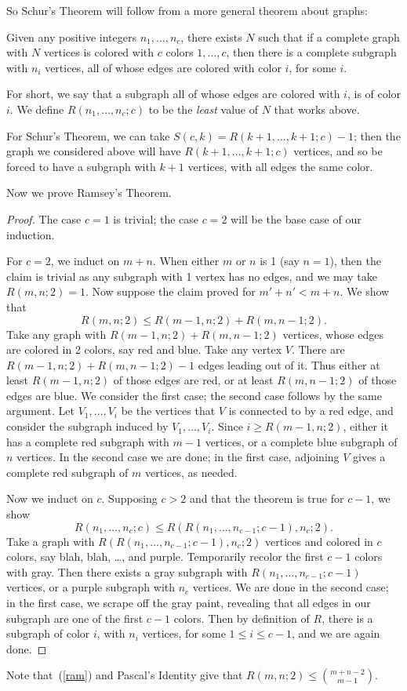 So Schur's Theorem will follow from a more general theorem about graphs:
\begin{thm}[Ramsey]\label{ramsey}
Given any positive integers $n_1,\ldots, n_c$, there exists $N$ such that if a complete graph with $N$ vertices is colored with $c$ colors $1,\ldots, c$, then there is a complete subgraph with $n_i$ vertices, all of whose edges are colored with color $i$, for some $i$.
\end{thm}
For short, we say that a subgraph all of whose edges are colored with $i$, is of color $i$. 
We define $R(n_1,\ldots, n_c;c)$ to be the {\it least} value of $N$ that works above.

For Schur's Theorem, we can take $S(c,k)=R(k+1,\ldots, k+1;c)-1$; then the graph we considered above will have $R(k+1,\ldots, k+1;c)$ vertices, and so be forced to have a subgraph with $k+1$ vertices, with all edges the same color.

Now we prove Ramsey's Theorem.
\begin{proof}
The case $c=1$ is trivial; the case $c=2$ will be the base case of our induction. 

For $c=2$, we induct on $m+n$.
When either $m$ or $n$ is 1 (say $n=1$), then the claim is trivial as any subgraph with 1 vertex has no edges, and we may take $R(m,n;2)=1$. Now suppose the claim proved for $m'+n'<m+n$. We show that
\begin{equation}\label{ram}
R(m,n;2)\leq R(m-1,n;2)+R(m,n-1;2).
\end{equation}
Take any graph with $R(m-1,n;2)+R(m,n-1;2)$ vertices, whose edges are colored in 2 colors, say red and blue. Take any vertex $V$. There are $R(m-1,n;2)+R(m,n-1;2)-1$ edges leading out of it. Thus either at least $R(m-1,n;2)$ of those edges are red, or at least $R(m,n-1;2)$ of those edges are blue. We consider the first case; the second case follows by the same argument. Let $V_1,\ldots, V_i$ be the vertices that $V$ is connected to by a red edge, and consider the subgraph induced by $V_1,\ldots, V_i$.  Since $i\geq R(m-1,n;2)$, either it has a complete red subgraph with $m-1$ vertices, or a complete blue subgraph of $n$ vertices. In the second case we are done; in the first case, adjoining $V$ gives a complete red subgraph of $m$ vertices, as needed.

Now we induct on $c$. Supposing $c>2$ and that the theorem is true for $c-1$, we show
\[
R(n_1,\ldots, n_c;c)\leq R(R(n_1,\ldots, n_{c-1};c-1),n_c;2).
\]
Take a graph with $R(R(n_1,\ldots, n_{c-1};c-1),n_c;2)$ vertices and colored in $c$ colors, say blah, blah, \ldots, and purple. Temporarily recolor the first $c-1$ colors with gray. Then there exists a gray subgraph with $R(n_1,\ldots, n_{c-1};c-1)$ vertices, or a purple subgraph with $n_c$ vertices. We are done in the second case; in the first case, we scrape off the gray paint, revealing that all edges in our subgraph are one of the first $c-1$ colors. Then by definition of $R$, there is a subgraph of color $i$, with $n_i$ vertices, for some $1\leq i\leq c-1$, and we are again done.
\end{proof}
Note that~(\ref{ram}) and Pascal's Identity give that $R(m,n;2)\leq \binom{m+n-2}{m-1}$.

